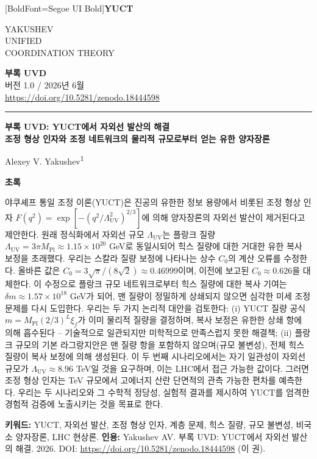 \documentclass[11pt,a4paper]{article}
\newcommand{\Mpl}{M_{\mathrm{Pl}}}
\newcommand{\LUV}{\Lambda_{\mathrm{UV}}}
\theoremstyle{remark}
\newcommand{\makeheader}{%
	\noindent
	\begin{minipage}{0.17\textwidth}
		\raggedright
		{\fontspec{Segoe UI}[BoldFont=Segoe UI Bold]\bfseries\color{skyblue}\fontsize{46}{46}\selectfont YUCT}%
	\end{minipage}%
	\hspace{30pt}
	\begin{minipage}{0.32\textwidth}
		\raggedright
		{\sffamily\fontsize{11}{13}\selectfont YAKUSHEV\\ UNIFIED\\ COORDINATION THEORY}%
	\end{minipage}%
	\hfill
	\begin{minipage}{0.38\textwidth}
		\raggedleft
		{\sffamily\bfseries 부록 UVD}\\ 
		{\sffamily 버전 1.0 / 2026년 6월}\\ 
		{\sffamily\footnotesize \url{https://doi.org/10.5281/zenodo.18444598}}%
	\end{minipage}
	\par\vspace{5pt}
	\noindent\textcolor{gold}{\rule{\textwidth}{1.6pt}}
	\par\vspace{0pt}
}
\begin{document}
	\thispagestyle{firstpage}
	\makeheader
	
	\vspace{0.5cm}
	{\LARGE\bfseries 부록 UVD: YUCT에서 자외선 발산의 해결 \\
		\Large 조정 형상 인자와 조정 네트워크의 물리적 규모로부터 얻는 유한 양자장론 \par}
	\vspace{0.3cm}
	
	{\large Alexey V. Yakushev\textsuperscript{1}} \\
	\vspace{0.2cm}
	
	{\color{darkblue}\textbf{\LARGE 초록}} \par
	{\large
		\noindent
		야쿠셰프 통일 조정 이론(YUCT)은 진공의 유한한 정보 용량에서 비롯된 조정 형상 인자 \(F(q^2) = \exp[-(q^2/\LUV^2)^{2/3}]\)에 의해 양자장론의 자외선 발산이 제거된다고 제안한다. 원래 정식화에서 자외선 규모 \(\LUV\)는 플랑크 질량 \(\LUV = 3\pi\Mpl \approx 1.15\times 10^{20}\) GeV로 동일시되어 힉스 질량에 대한 거대한 유한 복사 보정을 초래했다. 우리는 스칼라 질량 보정에 나타나는 상수 \(C_0\)의 계산 오류를 수정한다. 올바른 값은 \(C_0 = 3\sqrt{\pi}/(8\sqrt{2}) \approx 0.46999\)이며, 이전에 보고된 \(C_0 \approx 0.626\)을 대체한다. 이 수정으로 플랑크 규모 네트워크로부터 힉스 질량에 대한 복사 기여는 \(\delta m \approx 1.57\times 10^{18}\) GeV가 되어, 맨 질량이 정밀하게 상쇄되지 않으면 심각한 미세 조정 문제를 다시 도입한다. 우리는 두 가지 논리적 대안을 검토한다: (i) YUCT 질량 공식 \(m = \Mpl(2/3)^L\xi_f\)가 이미 물리적 질량을 결정하며, 복사 보정은 유한한 상쇄 항에 의해 흡수된다 – 기술적으로 일관되지만 미학적으로 만족스럽지 못한 해결책; (ii) 플랑크 규모의 기본 라그랑지안은 맨 질량 항을 포함하지 않으며(규모 불변성), 전체 힉스 질량이 복사 보정에 의해 생성된다. 이 두 번째 시나리오에서는 자기 일관성이 자외선 규모가 \(\LUV \approx 8.96\) TeV일 것을 요구하며, 이는 LHC에서 접근 가능한 값이다. 그러면 조정 형상 인자는 TeV 규모에서 고에너지 산란 단면적의 관측 가능한 편차를 예측한다. 우리는 두 시나리오와 그 수학적 정당성, 실험적 결과를 제시하여 YUCT를 엄격한 경험적 검증에 노출시키는 것을 목표로 한다.
	}
	
	\vspace{0.2cm}
	\noindent
	{\color{darkblue}\textbf{키워드:}} YUCT, 자외선 발산, 조정 형상 인자, 계층 문제, 힉스 질량, 규모 불변성, 비국소 양자장론, LHC 현상론.
	\vspace{0.1cm}
	\noindent
	{\color{darkblue}\textbf{인용:}} Yakushev AV. 부록 UVD: YUCT에서 자외선 발산의 해결. 2026. DOI: \url{https://doi.org/10.5281/zenodo.18444598} (이 권).
	
\end{document}

